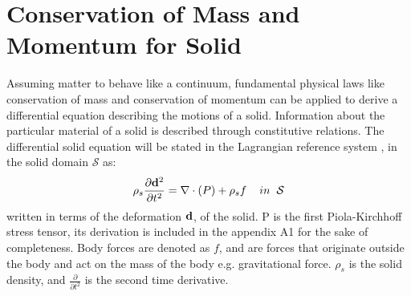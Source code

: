 \section{Conservation of Mass and Momentum for Solid}
Assuming matter to behave like a continuum, fundamental physical laws like conservation of mass and conservation of momentum can be applied to derive a differential equation describing the motions of a solid. Information about the particular material of a solid is described through constitutive relations.
The differential solid equation will be stated in the Lagrangian reference system \cite{Holzapfel2000}, in the solid domain $\mathcal{S}$ as:
\begin{equation}\label{eq:Solid}
\rho_s \frac{\partial \bold{d}^2}{\partial t^2} = \nabla \cdot ( P ) + \rho_s f  \hspace{4mm} in \hspace{2mm} \mathcal{S}
\end{equation}
written in terms of the deformation $\bold{d}$, of the solid.
P is the first Piola-Kirchhoff stress tensor, its derivation is included in the appendix A1 for the sake of completeness.
Body forces are denoted as $f$, and are forces that originate outside the body and act on the mass of the body e.g. gravitational force. $\rho_s$ is the solid density, and $\frac{\partial}{\partial t^2}$ is the second time derivative. 

\begin{comment}
\subsection*{Locking}
The problem og shear locking can happen FEM computations with certain elements. 
[mek4250 Kent] - Locking occurs if  $ \lambda >> \nu $ that is, the material is nearly incompressible. The reason is that all the elements discussed in this course are poor at approximating the divergence. Locking refers to the case where the displacement is to small because the divergence term essentially lock the displacement. It is a numerical artifact not a physical feature. [Verbatum]
\end{comment}
